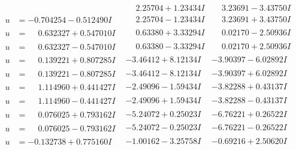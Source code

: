 \documentclass[1p]{elsarticle_modified}
\theoremstyle{definition}
\begin{document}
$$\begin{array}{c|c|c}
 & \phantom{-}2.25704 + 1.23434 I & \phantom{-}3.23691 - 3.43750 I \\ \hline\begin{aligned}
u &= -0.704254 - 0.512490 I\end{aligned}
 & \phantom{-}2.25704 - 1.23434 I & \phantom{-}3.23691 + 3.43750 I \\ \hline\begin{aligned}
u &= \phantom{-}0.632327 + 0.547010 I\end{aligned}
 & \phantom{-}0.63380 + 3.33294 I & \phantom{-}0.02170 - 2.50936 I \\ \hline\begin{aligned}
u &= \phantom{-}0.632327 - 0.547010 I\end{aligned}
 & \phantom{-}0.63380 - 3.33294 I & \phantom{-}0.02170 + 2.50936 I \\ \hline\begin{aligned}
u &= \phantom{-}0.139221 + 0.807285 I\end{aligned}
 & -3.46412 + 8.12134 I & -3.90397 - 6.02892 I \\ \hline\begin{aligned}
u &= \phantom{-}0.139221 - 0.807285 I\end{aligned}
 & -3.46412 - 8.12134 I & -3.90397 + 6.02892 I \\ \hline\begin{aligned}
u &= \phantom{-}1.114960 + 0.441427 I\end{aligned}
 & -2.49096 - 1.59434 I & -3.82288 + 0.43137 I \\ \hline\begin{aligned}
u &= \phantom{-}1.114960 - 0.441427 I\end{aligned}
 & -2.49096 + 1.59434 I & -3.82288 - 0.43137 I \\ \hline\begin{aligned}
u &= \phantom{-}0.076025 + 0.793162 I\end{aligned}
 & -5.24072 + 0.25023 I & -6.76221 + 0.26522 I \\ \hline\begin{aligned}
u &= \phantom{-}0.076025 - 0.793162 I\end{aligned}
 & -5.24072 - 0.25023 I & -6.76221 - 0.26522 I \\ \hline\begin{aligned}
u &= -0.132738 + 0.775160 I\end{aligned}
 & -1.00162 - 3.25758 I & -0.69216 + 2.50620 I \\ \hline\begin{aligned}

\end{aligned}
\end{array}$$
\end{document}
